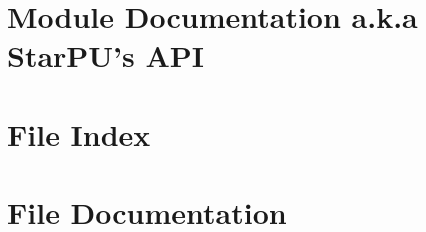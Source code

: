\chapter{Module Documentation a.k.a StarPU's API}
\label{ModuleDocumentation}
\hypertarget{ModuleDocumentation}{}












































\chapter{File Index}


\chapter{File Documentation}
\label{FileDocumentation}
\hypertarget{FileDocumentation}{}

